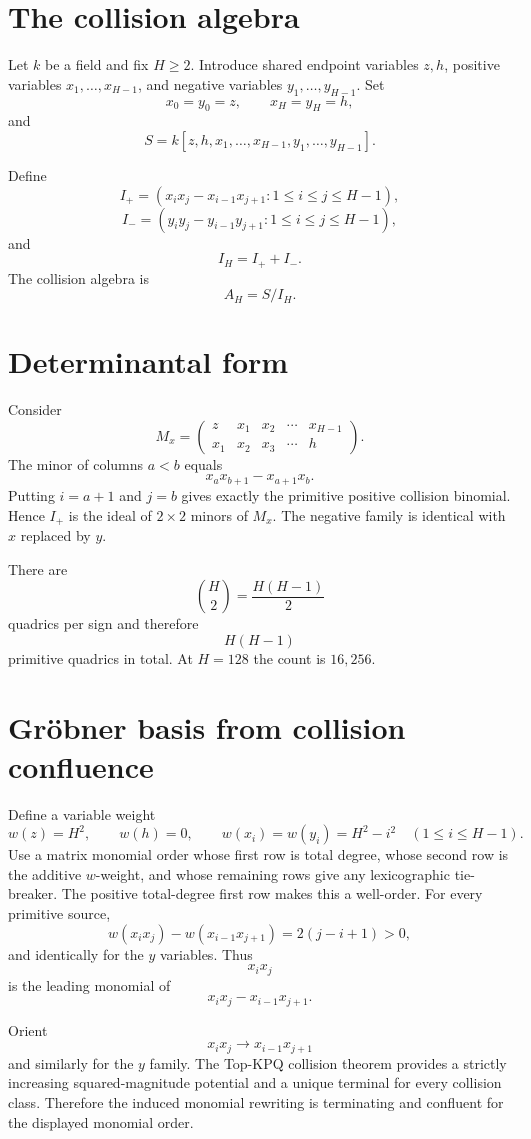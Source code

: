 \documentclass[11pt]{article}
\theoremstyle{definition}
\begin{document}
\section{The collision algebra}
Let $k$ be a field and fix $H\ge2$. Introduce shared endpoint variables $z,h$, positive variables $x_1,\ldots,x_{H-1}$, and negative variables $y_1,\ldots,y_{H-1}$. Set
\[
x_0=y_0=z,\qquad x_H=y_H=h,
\]
and
\[
S=k[z,h,x_1,\ldots,x_{H-1},y_1,\ldots,y_{H-1}].
\]

Define
\[
I_+=
(x_i x_j-x_{i-1}x_{j+1}:1\le i\le j\le H-1),
\]
\[
I_-=
(y_i y_j-y_{i-1}y_{j+1}:1\le i\le j\le H-1),
\]
and
\[
I_H=I_++I_-.
\]
The collision algebra is
\[
A_H=S/I_H.
\]

\section{Determinantal form}
Consider
\[
M_x=
\begin{pmatrix}
z&x_1&x_2&\cdots&x_{H-1}\\
x_1&x_2&x_3&\cdots&h
\end{pmatrix}.
\]
The minor of columns $a<b$ equals
\[
x_a x_{b+1}-x_{a+1}x_b.
\]
Putting $i=a+1$ and $j=b$ gives exactly the primitive positive collision binomial. Hence $I_+$ is the ideal of $2\times2$ minors of $M_x$. The negative family is identical with $x$ replaced by $y$.

There are
\[
\binom H2=\frac{H(H-1)}2
\]
quadrics per sign and therefore
\[
\boxed{H(H-1)}
\]
primitive quadrics in total. At $H=128$ the count is $16{,}256$.

\section{Gröbner basis from collision confluence}
Define a variable weight
\[
w(z)=H^2,\qquad w(h)=0,\qquad
w(x_i)=w(y_i)=H^2-i^2\quad(1\le i\le H-1).
\]
Use a matrix monomial order whose first row is total degree, whose second row is the additive $w$-weight, and whose remaining rows give any lexicographic tie-breaker. The positive total-degree first row makes this a well-order. For every primitive source,
\[
w(x_i x_j)-w(x_{i-1}x_{j+1})
=2(j-i+1)>0,
\]
and identically for the $y$ variables. Thus
\[
x_i x_j
\]
is the leading monomial of
\[
x_i x_j-x_{i-1}x_{j+1}.
\]

Orient
\[
x_i x_j\longrightarrow x_{i-1}x_{j+1}
\]
and similarly for the $y$ family. The Top-KPQ collision theorem provides a strictly increasing squared-magnitude potential and a unique terminal for every collision class. Therefore the induced monomial rewriting is terminating and confluent for the displayed monomial order.
\end{document}
